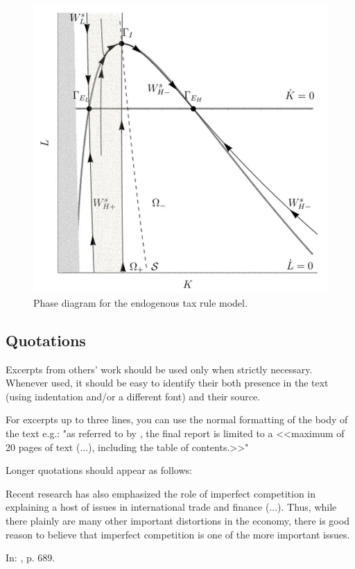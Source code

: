 \documentclass [12pt,a4paper,oneside]{article}
\begin{document}
\begin{figure}[h]%
\centering

\includegraphics[scale=0.35]{phase_diagram}

\caption{Phase diagram for the endogenous tax rule model.}
\label{fig:phase_diagram.}

\end{figure}


	\subsection{Quotations}

Excerpts from others' work should be used only when strictly necessary. Whenever used, it should be easy to identify their both presence in the text (using indentation and/or a different font) and their source.

For excerpts up to three lines, you can use the normal formatting of the body of the text e.g.: "as referred to by \cite{rodrigues_2014}, the final report is limited to a <<maximum of 20 pages of text (...), including the table of contents.>>"

Longer quotations should appear as follows:

\begin{displayquote}
{\small Recent research has also emphasized the role of imperfect competition in explaining a host of issues in international trade and finance (...). Thus, while there plainly are many other important distortions in the economy, there is good reason to believe that imperfect competition is one of the more important issues.}
\begin{flushright}
In: \cite{obstfeld_rogoff_1996}, p. 689.
\end{flushright}
\end{displayquote}
\end{document}
